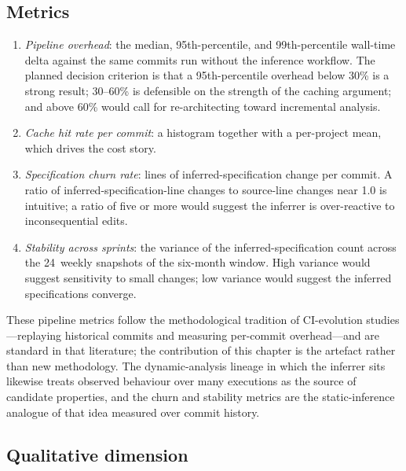 \subsection{Metrics}

\begin{enumerate}
    \item \emph{Pipeline overhead}: the median, 95th-percentile, and
    99th-percentile wall-time delta against the same commits run without the
    inference workflow. The planned decision criterion is that a 95th-percentile
    overhead below 30\% is a strong result; 30--60\% is defensible on the
    strength of the caching argument; and above 60\% would call for
    re-architecting toward incremental analysis.

    \item \emph{Cache hit rate per commit}: a histogram together with a per-project
    mean, which drives the cost story.

    \item \emph{Specification churn rate}: lines of inferred-specification change
    per commit. A ratio of inferred-specification-line changes to source-line
    changes near 1.0 is intuitive; a ratio of five or more would suggest the
    inferrer is over-reactive to inconsequential edits.

    \item \emph{Stability across sprints}: the variance of the
    inferred-specification count across the 24~weekly snapshots of the six-month
    window. High variance would suggest sensitivity to small changes; low
    variance would suggest the inferred specifications converge.
\end{enumerate}

These pipeline metrics follow the methodological tradition of CI-evolution
studies---replaying historical commits and measuring per-commit overhead---and
are standard in that literature; the contribution of this chapter is the
artefact rather than new methodology. The dynamic-analysis lineage in which the
inferrer sits \citep{ernst2007daikon} likewise treats observed behaviour over
many executions as the source of candidate properties, and the churn and
stability metrics are the static-inference analogue of that idea measured over
commit history.

\subsection{Qualitative dimension}

